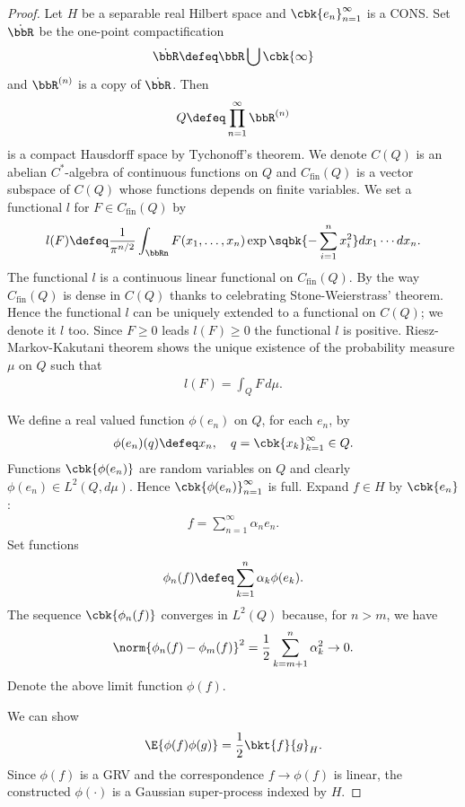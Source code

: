 \documentclass[openany, a4paper, oneside]{jsbook}
\begin{document}
\begin{proof}
 Let $H$ be a separable real Hilbert space and $\cbk{e_n}_{n=1}^{\infty}$ is a CONS.
 Set $\dot{\bbR}$ be the one-point compactification
  \begin{align}
   \dot{\bbR} \defeq \bbR \bigcup \cbk{\infty}
  \end{align}
 and $\bbR^{(n)}$ is a copy of $\dot{\bbR}$.
 Then
 \begin{align}
  Q
  \defeq
  \prod_{n=1}^{\infty} \bbR^{(n)}
 \end{align}
 is a compact Hausdorff space by Tychonoff's theorem.
 We denote $C (Q)$ is an abelian $C^*$-algebra of continuous functions on $Q$
 and $C_{\mathrm{fin}} (Q)$ is a vector subspace of $C (Q)$ whose functions depends on finite variables.
 We set a functional $l$ for $F \in C_{\mathrm{fin}} (Q)$ by
 \begin{align}
  l (F)
  \defeq
  \frac{1}{\pi^{n/2}} \int_{\bbRn} F (x_1, \dots, x_n) \exp \sqbk{- \sum_{i=1}^{n} x_i^2} dx_1 \cdots dx_n.
 \end{align}
 The functional $l$ is a continuous linear functional on $C_{\mathrm{fin}} (Q)$.
 By the way $C_{\mathrm{fin}} (Q)$ is dense in $C (Q)$ thanks to celebrating Stone-Weierstrass' theorem.
 Hence the functional $l$ can be uniquely extended to a functional on $C (Q)$; we denote it $l$ too.
 Since $F \geq 0$ leads $l (F) \geq 0$ the functional $l$ is positive.
 Riesz-Markov-Kakutani theorem shows the unique existence of the probability measure $\mu$ on $Q$ such that
 \begin{align}
  l (F)
  =
  \int_Q F \, d \mu.
 \end{align}

 We define a real valued function $\phi (e_n)$ on $Q$, for each $e_n$, by
 \begin{align}
  \phi (e_n) (q) \defeq x_n, \quad q = \cbk{x_k}_{k=1}^{\infty} \in Q.
 \end{align}
 Functions $\cbk{\phi (e_n)}$ are random variables on $Q$ and clearly $\phi (e_n) \in L^2 (Q, d \mu)$.
 Hence $\cbk{\phi (e_n)}_{n=1}^{\infty}$ is full.
 Expand $f \in H$ by $\cbk{e_n}$:
 \begin{align}
  f = \sum_{n=1}^{\infty} \alpha_n e_n.
 \end{align}
 Set functions
 \begin{align}
  \phi_n (f)
  \defeq
  \sum_{k=1}^{n} \alpha_k \phi (e_k).
 \end{align}
 The sequence $\cbk{\phi_n (f)}$ converges in $L^2 (Q)$ because, for $n > m$, we have
 \begin{align}
  \norm{\phi_n (f) - \phi_m (f)}^2
  =
  \frac{1}{2} \sum_{k = m+1}^{n} \alpha_k^2
  \to 0.
 \end{align}
 Denote the above limit function $\phi (f)$.

 We can show
 \begin{align}
  \E{\phi (f) \phi (g)} = \frac{1}{2} \bkt{f}{g}_{H}.
 \end{align}
 Since $\phi (f)$ is a GRV and the correspondence $f \to \phi (f)$ is linear,
 the constructed $\phi (\cdot)$ is a Gaussian super-process indexed by $H$.
\end{proof}
\end{document}
